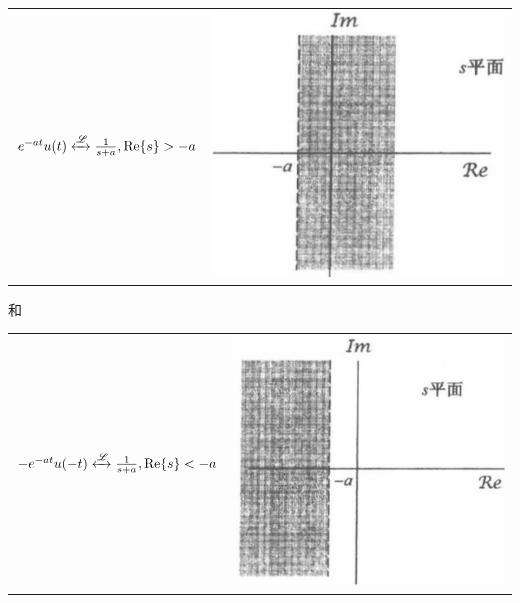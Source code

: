 \documentclass[CJKutf8,dvipsnames,table]{beamer}
\begin{document}
\begin{CJK*}{UTF8}{song}
\begin{frame}
\begin{itemize}
\begin{itemize}
\begin{tabular}{ll}
		$
			e^{-at}u(t) \xleftrightarrow{\mathscr{L}} \frac{1}{s+a}, \operatorname{Re}\{s\} > -a
		$
&
    \includegraphics[valign=m,scale=.2]{ss-c-f9-1a}    \\
    \end{tabular} 

		和 \\
	\begin{tabular}{ll}
	\raisebox{-.5\height}

		$
			-e^{-at}u(-t) \xleftrightarrow{\mathscr{L}} \frac{1}{s+a}, \operatorname{Re}\{s\} < -a
		$
&
    \includegraphics[valign=m,scale=.2]{ss-c-f9-1b}    \\
    \end{tabular}  		

		\end{itemize}
   	\end{itemize}
  \end{frame} 
        

\end{CJK*}
\end{document}
